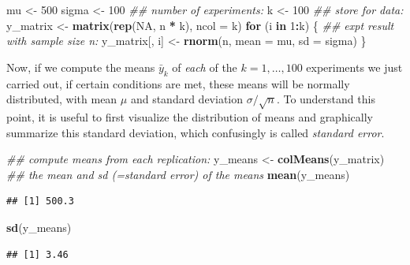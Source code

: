 \documentclass[12pt,]{krantz}
\newenvironment{Shaded}{\begin{snugshade}}{\end{snugshade}}
\newcommand{\CommentTok}[1]{\textcolor[rgb]{0.56,0.35,0.01}{\textit{#1}}}
\newcommand{\ControlFlowTok}[1]{\textcolor[rgb]{0.13,0.29,0.53}{\textbf{#1}}}
\newcommand{\DataTypeTok}[1]{\textcolor[rgb]{0.13,0.29,0.53}{#1}}
\newcommand{\DecValTok}[1]{\textcolor[rgb]{0.00,0.00,0.81}{#1}}
\newcommand{\KeywordTok}[1]{\textcolor[rgb]{0.13,0.29,0.53}{\textbf{#1}}}
\newcommand{\NormalTok}[1]{#1}
\newcommand{\OperatorTok}[1]{\textcolor[rgb]{0.81,0.36,0.00}{\textbf{#1}}}
\newcommand{\OtherTok}[1]{\textcolor[rgb]{0.56,0.35,0.01}{#1}}
\newcommand{\StringTok}[1]{\textcolor[rgb]{0.31,0.60,0.02}{#1}}
\begin{document}
\begin{Shaded}
\begin{Highlighting}[]
\NormalTok{mu <-}\StringTok{ }\DecValTok{500}
\NormalTok{sigma <-}\StringTok{ }\DecValTok{100}
\CommentTok{## number of experiments:}
\NormalTok{k <-}\StringTok{ }\DecValTok{100}
\CommentTok{## store for data:}
\NormalTok{y_matrix <-}\StringTok{ }\KeywordTok{matrix}\NormalTok{(}\KeywordTok{rep}\NormalTok{(}\OtherTok{NA}\NormalTok{, n }\OperatorTok{*}\StringTok{ }\NormalTok{k), }\DataTypeTok{ncol =}\NormalTok{ k)}
\ControlFlowTok{for}\NormalTok{ (i }\ControlFlowTok{in} \DecValTok{1}\OperatorTok{:}\NormalTok{k) \{}
  \CommentTok{## expt result with sample size n:}
\NormalTok{  y_matrix[, i] <-}\StringTok{ }\KeywordTok{rnorm}\NormalTok{(n, }\DataTypeTok{mean =}\NormalTok{ mu, }\DataTypeTok{sd =}\NormalTok{ sigma)}
\NormalTok{\}}
\end{Highlighting}
\end{Shaded}

Now, if we compute the means \(\bar{y}_k\) of \emph{each} of the \(k=1,\dots,100\) experiments we just carried out, if certain conditions are met, these means will be normally distributed, with mean \(\mu\) and standard deviation \(\sigma/\sqrt{n}\). To understand this point, it is useful to first visualize the distribution of means and graphically summarize this standard deviation, which confusingly is called \emph{standard error}.

\begin{Shaded}
\begin{Highlighting}[]
\CommentTok{## compute means from each replication:}
\NormalTok{y_means <-}\StringTok{ }\KeywordTok{colMeans}\NormalTok{(y_matrix)}
\CommentTok{## the mean and sd (=standard error) of the means}
\KeywordTok{mean}\NormalTok{(y_means)}
\end{Highlighting}
\end{Shaded}

\begin{verbatim}
## [1] 500.3
\end{verbatim}

\begin{Shaded}
\begin{Highlighting}[]
\KeywordTok{sd}\NormalTok{(y_means)}
\end{Highlighting}
\end{Shaded}

\begin{verbatim}
## [1] 3.46
\end{verbatim}
\end{document}
